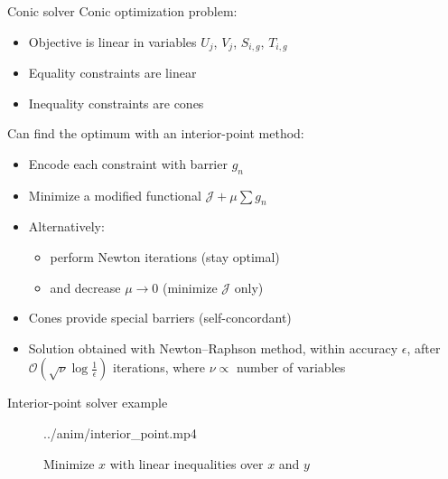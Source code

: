 \documentclass{beamer}  %
\begin{document}
\begin{frame}{Conic solver}
    Conic optimization problem:
    \begin{itemize}
        \item Objective is linear in variables $U_j$, $V_j$, $S_{i,g}$, $T_{i,g}$
        \item Equality constraints are linear
        \item Inequality constraints are cones
    \end{itemize}
    \vspace{6pt}
    Can find the optimum with an interior-point method:
    \begin{itemize}
        \item Encode each constraint with barrier $g_n$
        \item Minimize a modified functional $\mathcal{J} + \mu\sum g_n$
        \item Alternatively:
        \begin{itemize}
            \item perform Newton iterations (stay optimal)
            \item and decrease $\mu \to 0$ (minimize $\mathcal{J}$ only)
        \end{itemize} 
        \item Cones provide special barriers (self-concordant)
        \item Solution obtained with Newton–Raphson method, within accuracy $\epsilon$, after $\mathcal{O}(\sqrt{\nu} \log \frac{1}{\epsilon})$ iterations, where $\nu\propto$ number of variables
    \end{itemize}
\end{frame}

\begin{frame}{Interior-point solver example}
    \begin{figure}
        \centering
        \movie[width=0.7\textheight, height=0.7\textheight, showcontrols]{} {../anim/interior_point.mp4}
        \caption*{Minimize $x$ with linear inequalities over $x$ and $y$}
    \end{figure}
\end{frame}
\end{document}
